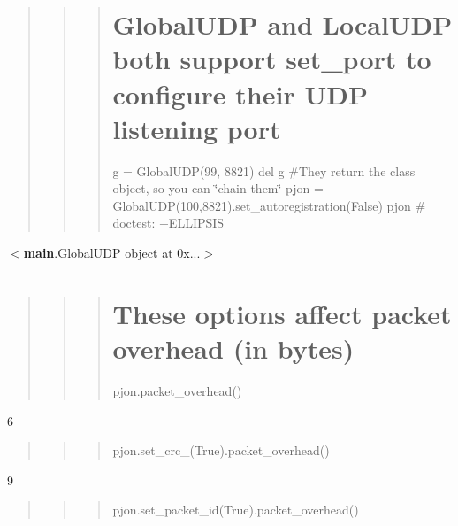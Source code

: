 \begin{quotation}
\begin{quotation}
\begin{quotation}
\section*{Global\-U\-D\-P and Local\-U\-D\-P both support set\-\_\-port to configure their U\-D\-P listening port}

g = Global\-U\-D\-P(99, 8821) del g \#\-They return the class object, so you can \char`\"{}chain them\char`\"{} pjon = Global\-U\-D\-P(100,8821).set\-\_\-autoregistration(\-False) pjon \# doctest\-: +\-E\-L\-L\-I\-P\-S\-I\-S

\end{quotation}


\end{quotation}


\end{quotation}
$<${\bfseries main}.Global\-U\-D\-P object at 0x...$>$ \begin{quotation}
\begin{quotation}
\begin{quotation}


\section*{These options affect packet overhead (in bytes)}

pjon.\-packet\-\_\-overhead()

\end{quotation}


\end{quotation}


\end{quotation}
6 \begin{quotation}
\begin{quotation}
\begin{quotation}
pjon.\-set\-\_\-crc\-\_(\-True).packet\-\_\-overhead()

\end{quotation}


\end{quotation}


\end{quotation}
9 \begin{quotation}
\begin{quotation}
\begin{quotation}
pjon.\-set\-\_\-packet\-\_\-id(\-True).packet\-\_\-overhead()

\end{quotation}


\end{quotation}


\end{quotation}
